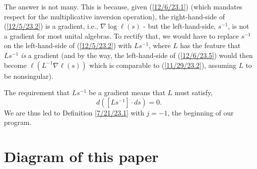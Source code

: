 \documentclass{amsart}
\numberwithin{equation}{section}
\theoremstyle{definition}
\numberwithin{theorem}{section}
\begin{document}
The answer is not many.  This is because, given (\ref{12/6/23.1}) (which mandates respect for the multiplicative inversion operation), the right-hand-side of (\ref{12/5/23.2}) is a gradient, i.e., $\nabla\log \ell(s)$ - but the left-hand-side, $s^{-1}$,  is not a gradient for most unital algebras.  
To rectify that, we would have to replace $s^{-1}$ on the left-hand-side of (\ref{12/5/23.2}) with $Ls^{-1}$, where $L$ has the feature that $Ls^{-1}$ {\it is} a gradient (and by the way, the left-hand-side of (\ref{12/6/23.5}) would then become $\ell(L^{-1}\nabla\ell(s))$ which is comparable to (\ref{11/29/23.2}), assuming $L$ to be nonsingular).   
\enlargethispage{1.5cm}

The requirement that $Ls^{-1}$ be a gradient means that $L$ must satisfy, \[ d([Ls^{-1}]\cdot ds) = 0.\]  We are thus led to Definition \ref{7/21/23.1} with $j=-1$, the beginning of our program.

\newpage



\section{Diagram of this paper}

\vspace{.5cm}
 
\end{document}
